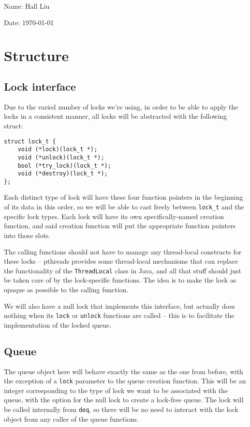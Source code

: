 \documentclass{article}
\begin{document}
Name: Hall Liu

Date: \today 
\vspace{1.5cm}

\section*{Structure}
\subsection*{Lock interface}
Due to the varied number of locks we're using, in order to be able to apply the locks in a consistent manner, all locks will be abstracted with the following struct:
\begin{verbatim}
struct lock_t {
    void (*lock)(lock_t *);
    void (*unlock)(lock_t *);
    bool (*try_lock)(lock_t *);
    void (*destroy)(lock_t *);
};
\end{verbatim}
Each distinct type of lock will have these four function pointers in the beginning of its data in this order, so we will be able to cast freely between \verb|lock_t| and the specific lock types. Each lock will have its own specifically-named creation function, and said creation function will put the appropriate function pointers into those slots. 

The calling functions should not have to manage any thread-local constructs for these locks -- pthreads provides some thread-local mechanisms that can replace the functionality of the \verb|ThreadLocal| class in Java, and all that stuff should just be taken care of by the lock-specific functions. The idea is to make the lock as opaque as possible to the calling function.

We will also have a null lock that implements this interface, but actually does nothing when its \verb|lock| or \verb|unlock| functions are called -- this is to facilitate the implementation of the locked queue.
\subsection*{Queue}
The queue object here will behave exactly the same as the one from before, with the exception of a \verb|lock| parameter to the queue creation function. This will be an integer corresponding to the type of lock we want to be associated with the queue, with the option for the null lock to create a lock-free queue. The lock will be called internally from \verb|deq|, so there will be no need to interact with the lock object from any caller of the queue functions. 
\end{document}
